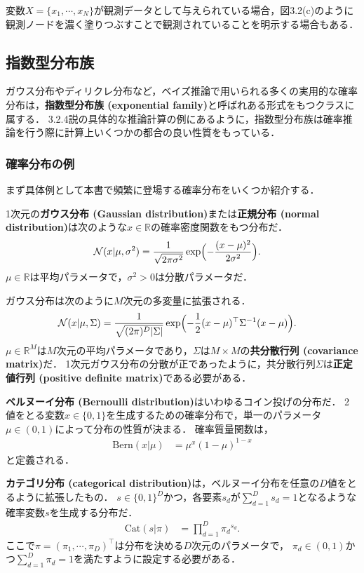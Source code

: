 \documentclass[11pt,a4paper]{jsarticle}
\numberwithin{equation}{section}
\begin{document}
変数$X = \{ x_1, \cdots, x_N \}$が観測データとして与えられている場合，図3.2(c)のように観測ノードを濃く塗りつぶすことで観測されていることを明示する場合もある．

\subsection{指数型分布族}
ガウス分布やディリクレ分布など，ベイズ推論で用いられる多くの実用的な確率分布は，\textbf{指数型分布族 (exponential family)}と呼ばれある形式をもつクラスに属する．
3.2.4説の具体的な推論計算の例にあるように，指数型分布族は確率推論を行う際に計算上いくつかの都合の良い性質をもっている．

\subsubsection{確率分布の例}
まず具体例として本書で頻繁に登場する確率分布をいくつか紹介する．

1次元の\textbf{ガウス分布 (Gaussian distribution)}または\textbf{正規分布 (normal distribution)}は次のような$x \in \mathbb{R}$の確率密度関数をもつ分布だ．
\begin{align}
\mathcal{N} (x | \mu, \sigma^2)
& =
\frac{1}{\sqrt{2 \pi \sigma^2}} \exp \Bigl( -\frac{(x - \mu)^2}{2 \sigma^2} \Bigr).
\end{align}
$\mu \in \mathbb{R}$は平均パラメータで，$\sigma^2 > 0$は分散パラメータだ．

ガウス分布は次のように$M$次元の多変量に拡張される．
\begin{align}
\mathcal{N} (x | \mu, \Sigma)
& =
\frac{1}{\sqrt{(2 \pi)^D |\Sigma|}} \exp \Bigl( -\frac{1}{2} (x - \mu)^\top \Sigma^{-1} (x - \mu) \Bigr).
\end{align}
$\mu \in \mathbb{R}^M$は$M$次元の平均パラメータであり，$\Sigma$は$M \times M$の\textbf{共分散行列 (covariance matrix)}だ．
1次元ガウス分布の分散が正であったように，共分散行列$\Sigma$は\textbf{正定値行列 (positive definite matrix)}である必要がある．

\textbf{ベルヌーイ分布 (Bernoulli distribution)}はいわゆるコイン投げの分布だ．
2値をとる変数$x \in \{ 0, 1 \}$を生成するための確率分布で，単一のパラメータ$\mu \in (0, 1)$によって分布の性質が決まる．
確率質量関数は，
\begin{align}
\mathrm{Bern} (x | \mu)
& =
\mu^x (1 - \mu)^{1 - x}
\end{align}
と定義される．

\textbf{カテゴリ分布 (categorical distribution)}は，ベルヌーイ分布を任意の$D$値をとるように拡張したもの．
$s \in \{ 0, 1 \}^D$かつ，各要素$s_d$が$\sum_{d=1}^D s_d = 1$となるような確率変数$s$を生成する分布だ．
\begin{align}
\mathrm{Cat} (s | \pi)
& =
\prod_{d = 1}^D {\pi_d}^{s_d}.
\end{align}
ここで$\pi = (\pi_1, \cdots, \pi_D)^\top$は分布を決める$D$次元のパラメータで，
$\pi_d \in (0, 1)$かつ$\sum_{d=1}^D \pi_d = 1$を満たすように設定する必要がある．
\end{document}
